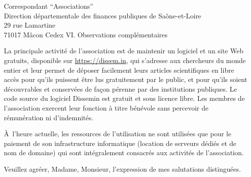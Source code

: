 \documentclass[11pt]{lettre}
\begin{document}
\begin{letter}{Correspondant ``Associations''\\Direction départementale des finances publiques de Saône-et-Loire\\29 rue Lamartine\\71017 Mâcon Cedex}
  \bigskip
  {\Large VI. Observations complémentaires}

  La principale activité de l'association est de maintenir un logiciel et un
  site Web gratuits, disponible sur \url{https://dissem.in}, qui s'adresse aux chercheurs du monde
  entier et leur permet de déposer facilement leurs articles scientifiques en
  libre accès pour qu'ils puissent être lus gratuitement par le public, et pour
  qu'ils soient découvrables et conservées de façon pérenne par des institutions
  publiques. Le code source du logiciel Dissemin est gratuit et sous licence
  libre. Les membres de l'association exercent leur fonction à titre bénévole
  sans percevoir de rémunération ni d'indemnités.

  À l'heure actuelle, les ressources de l'utilisation ne sont utilisées que pour
  le paiement de son infrastructure informatique (location de serveurs dédiés et
  de nom de domaine) qui sont intégralement consacrés aux activités de
  l'association.

  Veuillez agréer, Madame, Monsieur, l'expression de mes salutations distinguées.

\vspace{2cm}

\hspace{10cm}\begin{minipage}{6cm}
\end{minipage}

\thispagestyle{empty}
\end{letter}
\end{document}
